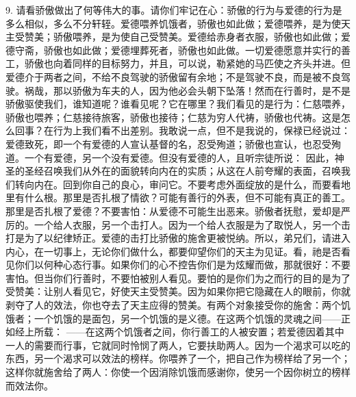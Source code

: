 9. 请看骄傲做出了何等伟大的事。请你们牢记在心：骄傲的行为与爱德的行为是多么相似，多么不分轩轾。爱德喂养饥饿者，骄傲也如此做；爱德喂养，是为使天主受赞美；骄傲喂养，是为使自己受赞美。爱德给赤身者衣服，骄傲也如此做；爱德守斋，骄傲也如此做；爱德埋葬死者，骄傲也如此做。一切爱德愿意并实行的善工，骄傲也向着同样的目标努力，并且，可以说，勒紧她的马匹使之齐头并进。但爱德介于两者之间，不给不良驾驶的骄傲留有余地；不是驾驶不良，而是被不良驾驶。祸哉，那以骄傲为车夫的人，因为他必会头朝下坠落！然而在行善时，是不是骄傲驱使我们，谁知道呢？谁看见呢？它在哪里？我们看见的是行为：仁慈喂养，骄傲也喂养；仁慈接待旅客，骄傲也接待；仁慈为穷人代祷，骄傲也代祷。这是怎么回事？在行为上我们看不出差别。我敢说一点，但不是我说的，保禄已经说过：爱德致死，即一个有爱德的人宣认基督的名，忍受殉道；骄傲也宣认，也忍受殉道。一个有爱德，另一个没有爱德。但没有爱德的人，且听宗徒所说： 因此，神圣的圣经召唤我们从外在的面貌转向内在的实质；从这在人前夸耀的表面，召唤我们转向内在。回到你自己的良心，审问它。不要考虑外面绽放的是什么，而要看地里有什么根。那里是否扎根了情欲？可能有善行的外表，但不可能有真正的善工。那里是否扎根了爱德？不要害怕：从爱德不可能生出恶来。骄傲者抚慰，爱却是严厉的。一个给人衣服，另一个击打人。因为一个给人衣服是为了取悦人，另一个击打是为了以纪律矫正。爱德的击打比骄傲的施舍更被悦纳。所以，弟兄们，请进入内心，在一切事上，无论你们做什么，都要仰望你们的天主为见证。看，祂是否看见你们以何种心态行事。如果你们的心不控告你们是为炫耀而做，那就很好：不要害怕。但当你们行善时，不要怕被别人看见。要怕的是你们为之而行的目的是为了受赞美：让别人看见它，好使天主受赞美。因为如果你把它隐藏在人的眼前，你就剥夺了人的效法，你也夺去了天主应得的赞美。有两个对象接受你的施舍：两个饥饿者；一个饥饿的是面包，另一个饥饿的是义德。在这两个饥饿的灵魂之间——正如经上所载： ——在这两个饥饿者之间，你行善工的人被安置；若爱德因着其中一人的需要而行事，它就同时怜悯了两人，它要扶助两人。因为一个渴求可以吃的东西，另一个渴求可以效法的榜样。你喂养了一个，把自己作为榜样给了另一个；这样你就施舍给了两人：你使一个因消除饥饿而感谢你，使另一个因你树立的榜样而效法你。\par


